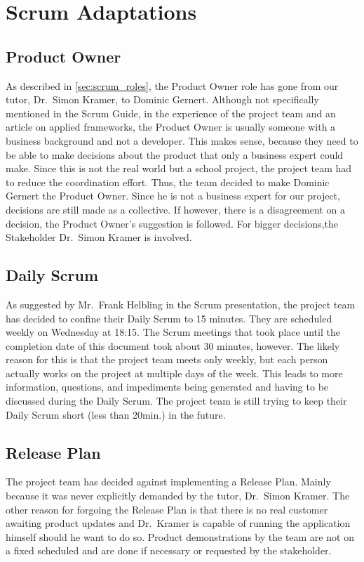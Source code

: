 \section{Scrum Adaptations}\label{sec:scrum-adaptations}
\subsection{Product Owner}\label{subsec:product-owner}
As described in \autoref{sec:scrum_roles}, the Product Owner role has gone from our tutor, Dr.\ Simon Kramer, to Dominic Gernert.
Although not specifically mentioned in the Scrum Guide\cite{scrum_guide}, in the experience
of the project team and an article on applied frameworks\cite{applied_frameworks_po}, the Product Owner is usually someone with a business background and not a developer.
This makes sense, because they need to be able to make decisions about the product that only a business expert could make.
Since this is not the real world but a school project, the project team had to reduce the coordination effort.
Thus, the team decided to make Dominic Gernert the Product Owner.
Since he is not a business expert for our project, decisions are still made as a collective.
If however, there is a disagreement on a decision, the Product Owner's suggestion is followed.
For bigger decisions,the Stakeholder Dr.\ Simon Kramer is involved.
\subsection{Daily Scrum}\label{subsec:daily-scrum}
As suggested by Mr.\ Frank Helbling in the Scrum presentation\cite{helbling_scrum3}, the project team has decided to confine their Daily Scrum to 15 minutes.
They are scheduled weekly on Wednesday at 18:15.
The Scrum meetings that took place until the completion date of this document took about 30 minutes, however.
The likely reason for this is that the project team meets only weekly,
but each person actually works on the project at multiple days of the week.
This leads to more information, questions, and impediments being generated and having to be discussed during the Daily Scrum.
The project team is still trying to keep their Daily Scrum short (less than 20min.) in the future.
\subsection{Release Plan}\label{subsec:release-plan}
The project team has decided against implementing a Release Plan.
Mainly because it was never explicitly demanded by the tutor, Dr.\ Simon Kramer.
The other reason for forgoing the Release Plan is that
there is no real customer awaiting product updates and Dr.\ Kramer is capable of running the application himself should he want to do so.
Product demonstrations by the team are not on a fixed scheduled and
are done if necessary or requested by the stakeholder.
